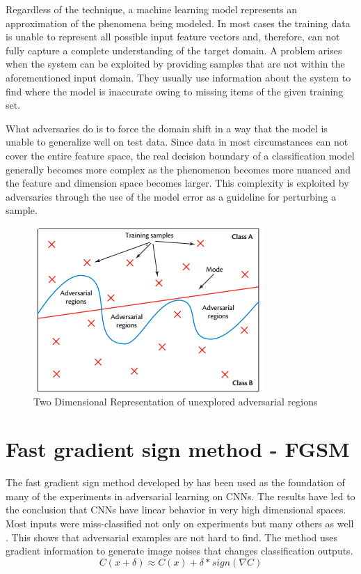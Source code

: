 Regardless of the technique, a machine learning model represents an approximation of the phenomena being modeled. In most cases the training data is unable to represent all possible input feature vectors and, therefore, can not fully capture a complete understanding of the target domain. A problem arises when the system can be exploited by providing samples that are not within the aforementioned input domain. They usually use information about the system to find where the model is inaccurate owing to missing items of the given training set.

What adversaries do is to force the domain shift in a way that the model is unable to generalize well on test data. Since data in most circumstances can not cover the entire feature space, the real decision boundary of a classification model generally becomes more complex as the phenomenon becomes more nuanced and the feature and dimension space becomes larger. This complexity is exploited by adversaries through the use of the model error as a guideline for perturbing a sample.

\begin{figure}[!h]
	\centering
	\includegraphics[scale=1.0]{adv_space.png}
	\caption{Two Dimensional Representation of unexplored adversarial regions \cite{papernot_2017}}
	\label{fig:adv_space}
\end{figure}

\section{Fast gradient sign method - FGSM}

The fast gradient sign method developed by \cite{goodfellow2014} has been used as the foundation of many of the experiments in adversarial learning on CNNs. The results have led to the conclusion that CNNs have linear behavior in very high dimensional spaces.  Most inputs were miss-classified not only on \cite{goodfellow2014} experiments but many others as well \cite{billovits, papernot2016, goodfellow2016}. This shows that adversarial examples are not hard to find. The method uses gradient information to generate image noises that changes classification outputs.
\begin{equation}
C(x + \delta)\approx C(x) + \delta * sign(\nabla C)
\end{equation}

